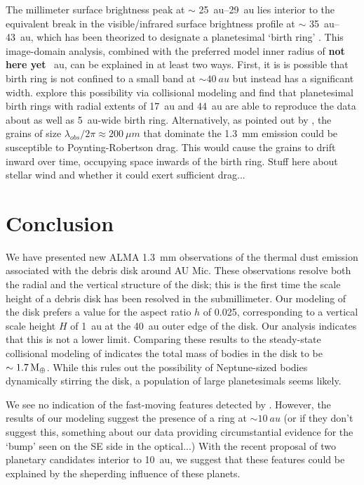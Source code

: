 \documentclass[12pt,oneside]{article}
\begin{document}
The millimeter surface brightness peak at $\sim$ \SIrange{25}{29}{au} lies interior to the equivalent break in the visible/infrared surface brightness profile at $\sim$ \SIrange{35}{43}{au}, which has been theorized to designate a planetesimal `birth ring' \citep{augereau&beust06,strubbe&chiang06,krist05}. 
This image-domain analysis, combined with the preferred model inner radius of \textbf{not here yet} \SI{}{au}, can be explained in at least two ways.
First, it is is possible that birth ring is not confined to a small band at $\sim \SI{40}{au}$ but instead has a significant width.
\cite{schuppler17} explore this possibility via collisional modeling and find that planetesimal birth rings with radial extents of \SI{17}{au} and \SI{44}{au} are able to reproduce the data about as well as \SI{5}{au}-wide birth ring.
Alternatively, as pointed out by \cite{matthews15}, the grains of size $\lambda_{obs}/2\pi \approx \SI{200}{\mu m}$ that dominate the \SI{1.3}{mm} emission could be susceptible to Poynting-Robertson drag.
This would cause the grains to drift inward over time, occupying space inwards of the birth ring.
Stuff here about stellar wind and whether it could exert sufficient drag...

\section{Conclusion}
\label{section: conclusion}

We have presented new ALMA \SI{1.3}{mm} observations of the thermal dust emission associated with the debris disk around AU Mic. 
These observations resolve both the radial and the vertical structure of the disk; this is the first time the scale height of a debris disk has been resolved in the submillimeter.
Our modeling of the disk prefers a value for the aspect ratio $h$ of 0.025, corresponding to a vertical scale height $H$ of \SI{1}{au} at the \SI{40}{au} outer edge of the disk.
Our analysis indicates that this is not a lower limit.
Comparing these results to the steady-state collisional modeling of \cite{pan&schlichting12} indicates the total mass of bodies in the disk to be $\sim \SI{1.7}{M_\oplus}$.
While this rules out the possibility of Neptune-sized bodies dynamically stirring the disk, a population of large planetesimals seems likely.

We see no indication of the fast-moving features detected by \cite{boccaletti15}. However, the results of our modeling suggest the presence of a ring at $\sim \SI{10}{au}$ (or if they don't suggest this, something about our data providing circumstantial evidence for the `bump' seen on the SE side in the optical...) With the recent proposal of two planetary candidates interior to \SI{10}{au}, we suggest that these features could be explained by the sheperding influence of these planets. 
\end{document}
